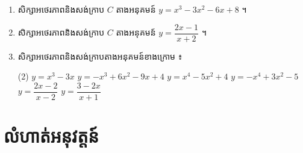 \begin{enumerate}[1]
  \item សិក្សាអថេរភាពនិងសង់ក្រាប $C$ តាងអនុគមន៍ $y = x^3 - 3x^2 - 6x + 8$ ។
  \item សិក្សាអថេរភាពនិងសង់ក្រាប $C$ តាងអនុគមន៍ $y = \dfrac{2x - 1}{x + 2}$ ។
  \item សិក្សាអថេរភាពនិងសង់ក្រាបតាងអនុគមន៍ខាងក្រោម ៖
  \begin{tasks}(2)
    \task $y = x^3 - 3x$
    \task $y = -x^3 + 6x^2 - 9x + 4$
    \task $y = x^4 - 5x^2 + 4$
    \task $y = -x^4 + 3x^2 - 5$
    \task $y = \dfrac{2x - 2}{x - 2}$
    \task $y = \dfrac{3 - 2x}{x + 1}$
  \end{tasks}
\end{enumerate}

\section*{លំហាត់អនុវត្តន៍}
